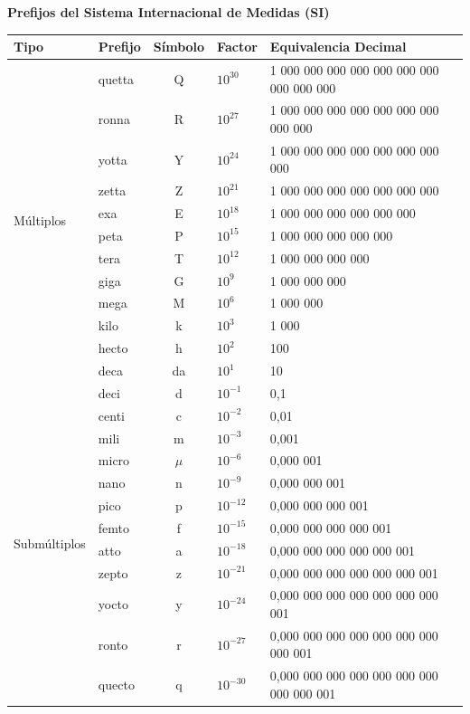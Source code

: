 \documentclass[12pt,a4paper]{article}
\begin{document}
\begin{center}
    \textbf{\LARGE Prefijos del Sistema Internacional de Medidas (SI)}
\end{center}
\vspace{0.5cm}

\begin{table}[h!]
\centering
\begin{tabular}{@{}llcll@{}}
\toprule
\textbf{Tipo} & \textbf{Prefijo} & \textbf{Símbolo} & \textbf{Factor} & \textbf{Equivalencia Decimal} \\ \midrule
\multirow{12}{*}{Múltiplos} 
& quetta & Q  & $10^{30}$ & 1 000 000 000 000 000 000 000 000 000 000 \\
& ronna  & R  & $10^{27}$ & 1 000 000 000 000 000 000 000 000 000 \\
& yotta  & Y  & $10^{24}$ & 1 000 000 000 000 000 000 000 000 \\
& zetta  & Z  & $10^{21}$ & 1 000 000 000 000 000 000 000 \\
& exa    & E  & $10^{18}$ & 1 000 000 000 000 000 000 \\
& peta   & P  & $10^{15}$ & 1 000 000 000 000 000 \\
& tera   & T  & $10^{12}$ & 1 000 000 000 000 \\
& giga   & G  & $10^{9}$  & 1 000 000 000 \\
& mega   & M  & $10^{6}$  & 1 000 000 \\
& kilo   & k  & $10^{3}$  & 1 000 \\
& hecto  & h  & $10^{2}$  & 100 \\
& deca   & da & $10^{1}$  & 10 \\ \midrule
\multirow{12}{*}{Submúltiplos} 
& deci   & d  & $10^{-1}$ & 0,1 \\
& centi  & c  & $10^{-2}$ & 0,01 \\
& mili   & m  & $10^{-3}$ & 0,001 \\
& micro  & $\mu$ & $10^{-6}$ & 0,000 001 \\
& nano   & n  & $10^{-9}$ & 0,000 000 001 \\
& pico   & p  & $10^{-12}$ & 0,000 000 000 001 \\
& femto  & f  & $10^{-15}$ & 0,000 000 000 000 001 \\
& atto   & a  & $10^{-18}$ & 0,000 000 000 000 000 001 \\
& zepto  & z  & $10^{-21}$ & 0,000 000 000 000 000 000 001 \\
& yocto  & y  & $10^{-24}$ & 0,000 000 000 000 000 000 000 001 \\
& ronto  & r  & $10^{-27}$ & 0,000 000 000 000 000 000 000 000 001 \\
& quecto & q  & $10^{-30}$ & 0,000 000 000 000 000 000 000 000 000 001 \\ \bottomrule
\end{tabular}
\end{table}
\end{document}
